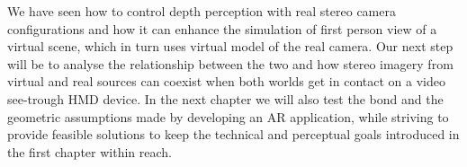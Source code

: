 We have seen how to control depth perception with real stereo camera configurations and how it can enhance the simulation of first person view of a virtual scene, which in turn uses virtual model of the real camera. Our next step will be to analyse the relationship between the two and how stereo imagery from virtual and real sources can coexist when both worlds get in contact on a video see-trough HMD device. In the next chapter we will also test the bond and the geometric assumptions made by developing an AR application, while striving to provide feasible solutions to keep the technical and perceptual goals introduced in the first chapter within reach.







